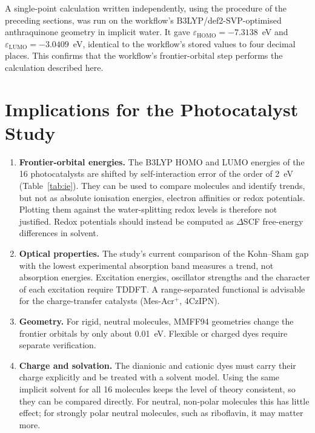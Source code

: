 \documentclass[11pt,a4paper]{article}
\begin{document}
A single-point calculation written independently, using the procedure of the preceding sections,
was run on the workflow's B3LYP/def2-SVP-optimised anthraquinone geometry in implicit water. It gave
$\varepsilon_\text{HOMO} = -7.3138$~eV and $\varepsilon_\text{LUMO} = -3.0409$~eV, identical to the
workflow's stored values to four decimal places. This confirms that the workflow's frontier-orbital
step performs the calculation described here.

\section{Implications for the Photocatalyst Study}

\begin{enumerate}
  \item \textbf{Frontier-orbital energies.} The B3LYP HOMO and LUMO energies of the 16
  photocatalysts are shifted by self-interaction error of the order of 2~eV (Table~\ref{tab:ie}).
  They can be used to compare molecules and identify trends, but not as absolute ionisation
  energies, electron affinities or redox potentials. Plotting them against the water-splitting
  redox levels is therefore not justified. Redox potentials should instead be computed as
  $\Delta$SCF free-energy differences in solvent.
  \item \textbf{Optical properties.} The study's current comparison of the Kohn--Sham gap with the
  lowest experimental absorption band measures a trend, not absorption energies. Excitation
  energies, oscillator strengths and the character of each excitation require TDDFT. A
  range-separated functional is advisable for the charge-transfer catalysts (Mes-Acr$^+$, 4CzIPN).
  \item \textbf{Geometry.} For rigid, neutral molecules, MMFF94 geometries change the frontier
  orbitals by only about 0.01~eV. Flexible or charged dyes require separate verification.
  \item \textbf{Charge and solvation.} The dianionic and cationic dyes must carry their charge
  explicitly and be treated with a solvent model. Using the same implicit solvent for all 16
  molecules keeps the level of theory consistent, so they can be compared directly. For neutral,
  non-polar molecules this has little effect; for strongly polar neutral molecules, such as
  riboflavin, it may matter more.
\end{enumerate}
\end{document}
